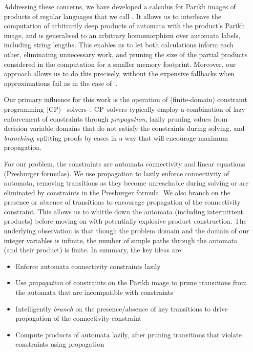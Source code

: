 Addressing these concerns, we have developed a calculus for Parikh images of
products of regular languages that we call \Calculus{}. It allows us to
interleave the computation of arbitrarily deep products of automata with the
product's Parikh image, and is generalised to an arbitrary homomorphism over
automata labels, including string lengths. This enables us to let both
calculations inform each other, eliminating unnecessary work, and pruning the
size of the partial products considered in the computation for a smaller memory
footprint. Moreover, our approach allows us to do this precisely, without the expensive
fallbacks when approximations fail as in the case of~\cite{approximate-parikh}.

Our primary influence for this work is the operation of (finite-domain) 
constraint programming (CP)%
~solvers~\cite{cp}. CP~solvers typically employ a combination of lazy enforcement
of constraints through \emph{propagation},
lazily pruning values from decision variable domains that do not satisfy 
the constraints during solving, and \emph{branching}, splitting proofs
by cases in a way that will encourage maximum propagation.

For our problem, the constraints are automata connectivity and linear
equations (Presburger formulas).
We use propagation to lazily enforce connectivity of automata,
removing transitions as they become unreachable during solving or are
eliminated by constraints in the Presburger formula. We
also branch on the presence or absence of transitions to
encourage propagation of the connectivity constraint. This allows
us to whittle down the automata
(including intermittent products) before moving on with potentially
 explosive product construction. The underlying observation
is that though the problem domain and the domain of our integer variables
is infinite, the number of simple paths
through the automata (and their product) is finite. In summary, the key ideas are:

{
    \centering
    \begin{tcolorbox}[colback=gray!5!white,colframe=gray!75!black,%
        title=Key ideas of \Calculus{},%
        width=0.8\linewidth]

        \begin{itemize}
            \item Enforce automata connectivity constraints lazily
            \item Use \emph{propagation} of constraints on the Parikh image to prune
            transitions from the automata that are incompatible with constraints
            \item Intelligently \emph{branch} on the presence\slash{}absence of key
             transitions to drive propagation of the connectivity constraint
             \item Compute products of automata lazily, after pruning transitions
             that violate constraints using propagation
        \end{itemize}
    \end{tcolorbox}
  }


